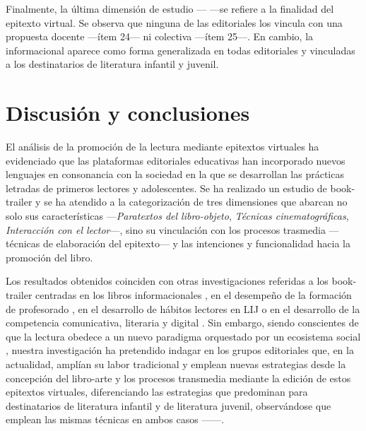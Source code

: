 \documentclass[spanish]{textolivre}
\begin{document}
Finalmente, la última dimensión de estudio — —se refiere a la finalidad del epitexto virtual. Se observa que ninguna de las editoriales los vincula con una propuesta docente —ítem 24— ni colectiva —ítem 25—. En cambio, la informacional aparece como forma generalizada en todas editoriales y vinculadas a los destinatarios de literatura infantil y juvenil.

\section{Discusión y conclusiones}

El análisis de la promoción de la lectura mediante epitextos virtuales ha evidenciado que las plataformas editoriales educativas han incorporado nuevos lenguajes en consonancia con la sociedad en la que se desarrollan las prácticas letradas de primeros lectores y adolescentes. Se ha realizado un estudio de book-trailer y se ha atendido a la categorización de tres dimensiones que abarcan no solo sus características —\emph{Paratextos del libro-objeto}, \emph{Técnicas cinematográficas}, \emph{Interacción con el lector}—, sino su vinculación con los procesos trasmedia —técnicas de elaboración del epitexto— y las intenciones y funcionalidad hacia la promoción del libro.

Los resultados obtenidos coinciden con otras investigaciones referidas a los book-trailer centradas en los libros informacionales \cite{tabernero2022promocion}, en el desempeño de la formación de profesorado \cite{romero2019book}, en el desarrollo de hábitos lectores en LIJ \cite{rovira2017booktrailer} o en el desarrollo de la competencia comunicativa, literaria y digital \cite{ibarra2016book}. Sin embargo, siendo conscientes de que la lectura obedece a un nuevo paradigma orquestado por un ecosistema social \cite{bronfenbrenner1983,bronfenbrenner_ecologia_1987}, nuestra investigación ha pretendido indagar en los grupos editoriales que, en la actualidad, amplían su labor tradicional y emplean nuevas estrategias desde la concepción del libro-arte \cite{colman2007new} y los procesos transmedia mediante la edición de estos epitextos virtuales, diferenciando las estrategias que predominan para destinatarios de literatura infantil y de literatura juvenil, observándose que emplean las mismas técnicas en ambos casos ——. 
\end{document}
